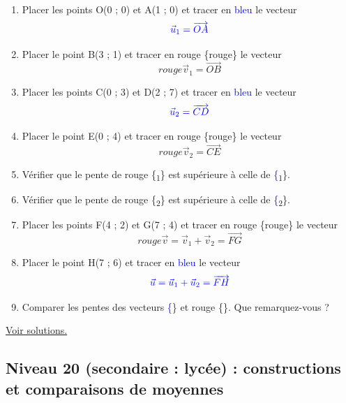 \documentclass[11pt]{article}
\begin{document}
\begin{enumerate}
\item Placer les points O(0 ; 0) et A(1 ; 0) et tracer en
\textcolor{blue}{bleu} le vecteur \[\textcolor{blue}{\vec{u}_1 =
   \overrightarrow{OA}}\]
\item Placer le point B(3 ; 1) et tracer en rouge \{rouge\} le
vecteur \[rouge {\vec{v}_1 = \overrightarrow{OB}}\]
\item Placer les points C(0 ; 3) et D(2 ; 7) et tracer en
\textcolor{blue}{bleu} le vecteur \[\textcolor{blue}{\vec{u}_2 =
   \overrightarrow{CD}}\]
\item Placer le point E(0 ; 4) et tracer en rouge \{rouge\} le
vecteur \[rouge {\vec{v}_2 = \overrightarrow{CE}}\]
\item Vérifier que le pente de rouge \{\textsubscript{1}\} est
supérieure à celle de \textcolor{blue}\{\textsubscript{1}\}.
\item Vérifier que le pente de rouge \{\textsubscript{2}\} est
supérieure à celle de \textcolor{blue}\{\textsubscript{2}\}.
\item Placer les points F(4 ; 2) et G(7 ; 4) et tracer en
rouge \{rouge\} le vecteur \[rouge {\vec{v} =
   \vec{v}_1 + \vec{v}_2 = \overrightarrow{FG}}\]
\item Placer le point H(7 ; 6) et tracer en \textcolor{blue}{bleu} le
vecteur \[\textcolor{blue}{\vec{u} = \vec{u}_1 + \vec{u}_2  =
   \overrightarrow{FH}}\]
\item Comparer les pentes des vecteurs \textcolor{blue}\{\} et
rouge \{\}. Que remarquez-vous ?
\end{enumerate}


\hyperref[orga6ef71f]{Voir solutions.}


\newpage



\subsection{Niveau 20 (secondaire : lycée) : constructions et comparaisons de moyennes}
\label{sec:org145f4a1}

\label{orgbff966e}
\end{document}
